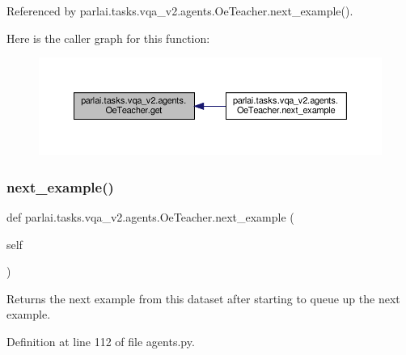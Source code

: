 Referenced by parlai.\+tasks.\+vqa\+\_\+v2.\+agents.\+Oe\+Teacher.\+next\+\_\+example().

Here is the caller graph for this function\+:
\nopagebreak
\begin{figure}[H]
\begin{center}
\leavevmode
\includegraphics[width=350pt]{classparlai_1_1tasks_1_1vqa__v2_1_1agents_1_1OeTeacher_a75d45765b191394b0defbbe3b8bb09e0_icgraph}
\end{center}
\end{figure}
\mbox{\label{classparlai_1_1tasks_1_1vqa__v2_1_1agents_1_1OeTeacher_aa1bd8754bec6bafbc67231d5fecb14b6}} 
\subsubsection{\texorpdfstring{next\+\_\+example()}{next\_example()}}
{\footnotesize\ttfamily def parlai.\+tasks.\+vqa\+\_\+v2.\+agents.\+Oe\+Teacher.\+next\+\_\+example (\begin{DoxyParamCaption}\item[{}]{self }\end{DoxyParamCaption})}

\begin{DoxyVerb}Returns the next example from this dataset after starting to queue
up the next example.
\end{DoxyVerb}
 

Definition at line 112 of file agents.\+py.




